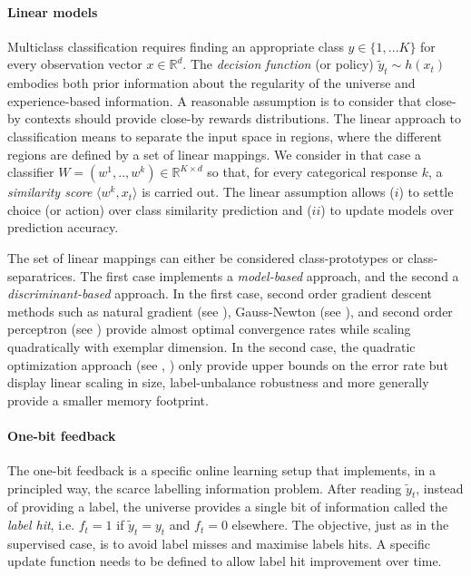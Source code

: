 \documentclass[preprint,12pt,authoryear]{elsarticle}
\begin{document}
\paragraph{Linear models}
Multiclass classification requires  finding an appropriate class $y \in \{1,... K\}$ for every observation vector $x \in \mathbb{R}^d$.
The \textit{decision function} (or policy) $\tilde{y}_t \sim h(x_t)$ embodies both prior information about the regularity of the universe and experience-based information. A reasonable assumption  is to consider that  close-by contexts should provide close-by rewards distributions. 
The linear approach to classification means to separate the input space in regions, where the different regions are defined by a set of linear mappings. We consider in that case a  classifier $W = (w^1,..,w^k) \in \mathbb{R}^{K \times d}$ so that, for every categorical response $k$, a \emph{similarity score} $\langle w^k, x_t\rangle$ is carried out. 
The linear assumption allows ($i$) to 
settle choice (or action) over class similarity prediction and ($ii$) to update models over prediction accuracy.

The set of linear mappings can either be considered class-prototypes or class-separatrices. The first case implements a \textit{model-based} approach, and the second a \textit{discriminant-based} approach. In the first case,  second order gradient descent methods such as natural gradient (see \cite{amari2000adaptive}), Gauss-Newton (see \cite{le2004large}), and second order perceptron (see \cite{cesa2005second}) provide almost optimal convergence rates while scaling quadratically with exemplar dimension.
In the second case, the quadratic optimization approach (see \cite{anlauf1989adatron}, \cite{crammer2006online}) only provide upper bounds on the error rate but display linear scaling in size, label-unbalance robustness and more generally provide a smaller memory footprint. 


\paragraph{One-bit feedback}
The one-bit feedback is a specific online learning setup that implements, in a principled way, the scarce labelling information problem. After reading $\tilde{y}_t$, instead of providing a label, the universe provides a single bit of information called the \textit{label hit}, i.e. $f_t = 1$ if  $\tilde{y}_t=y_t$ and $f_t = 0$ elsewhere. The objective, just as in the supervised case, is to avoid label misses and maximise labels hits. A specific update function needs to be defined to allow label hit improvement over time. 
\end{document}
